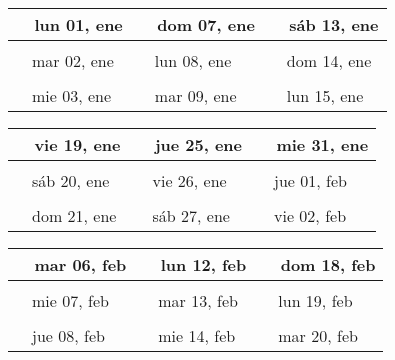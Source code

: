\documentclass[letterpaper,10pt]{article}
\begin{document}
\begin{tabular}{lll}
\\
{\ \ lun 01, ene\hspace{4.5cm}\vspace{2.25cm}} &{\ \ dom 07, ene\hspace{4.5cm}} &{\ \ sáb 13, ene\hspace{4.5cm}}
\\ \hline \\
{\ \ mar 02, ene\vspace{2.25cm}} & {\ \ lun 08, ene} & {\ \ dom 14, ene}
\\ \hline \\
{\ \ mie 03, ene\vspace{2.25cm}} & {\ \ mar 09, ene} & {\ \ lun 15, ene}
\\
\end{tabular}\par
\begin{tabular}{lll}
\\
{\ \ vie 19, ene\hspace{4.5cm}\vspace{2.25cm}} &{\ \ jue 25, ene\hspace{4.5cm}} &{\ \ mie 31, ene\hspace{4.5cm}}
\\ \hline \\
{\ \ sáb 20, ene\vspace{2.25cm}} & {\ \ vie 26, ene} & {\ \ jue 01, feb}
\\ \hline \\
{\ \ dom 21, ene\vspace{2.25cm}} & {\ \ sáb 27, ene} & {\ \ vie 02, feb}
\\
\end{tabular}\par
\begin{tabular}{lll}
\\
{\ \ mar 06, feb\hspace{4.5cm}\vspace{2.25cm}} &{\ \ lun 12, feb\hspace{4.5cm}} &{\ \ dom 18, feb\hspace{4.5cm}}
\\ \hline \\
{\ \ mie 07, feb\vspace{2.25cm}} & {\ \ mar 13, feb} & {\ \ lun 19, feb}
\\ \hline \\
{\ \ jue 08, feb\vspace{2.25cm}} & {\ \ mie 14, feb} & {\ \ mar 20, feb}
\\
\end{tabular}\par
\end{document}
